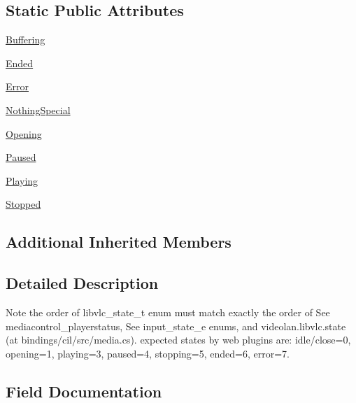 \subsection*{Static Public Attributes}
\begin{DoxyCompactItemize}
\item 
\hyperlink{classvlc_1_1_state_ab6c207754043f3e58a4238fd3dee26a6}{Buffering}
\item 
\hyperlink{classvlc_1_1_state_acebe38bc23c561f928cc9dbb0a321a58}{Ended}
\item 
\hyperlink{classvlc_1_1_state_a2c3e4bb40f36b262a5214e2da2bca9c5}{Error}
\item 
\hyperlink{classvlc_1_1_state_a7e0c35786bb3415f85ce66ca869ac169}{Nothing\+Special}
\item 
\hyperlink{classvlc_1_1_state_a6b78e2502627f7f09abf746ef0af5039}{Opening}
\item 
\hyperlink{classvlc_1_1_state_abba3b9a9b29998ce7472c02f14243d0e}{Paused}
\item 
\hyperlink{classvlc_1_1_state_adff0cb2b0b9f2305d3d3d0fc7aa6dd46}{Playing}
\item 
\hyperlink{classvlc_1_1_state_a1bff211f6153a28f68007d952467bb08}{Stopped}
\end{DoxyCompactItemize}
\subsection*{Additional Inherited Members}


\subsection{Detailed Description}
\begin{DoxyVerb}Note the order of libvlc_state_t enum must match exactly the order of
See mediacontrol_playerstatus, See input_state_e enums,
and videolan.libvlc.state (at bindings/cil/src/media.cs).
expected states by web plugins are:
idle/close=0, opening=1, playing=3, paused=4,
stopping=5, ended=6, error=7.
\end{DoxyVerb}
 

\subsection{Field Documentation}
\mbox{\label{classvlc_1_1_state_ab6c207754043f3e58a4238fd3dee26a6}} 
